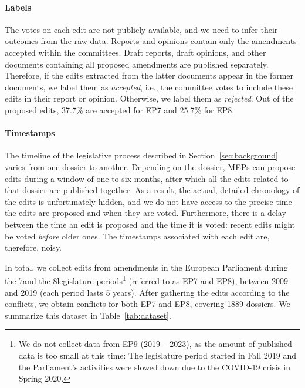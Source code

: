 \paragraph{Labels}
The votes on each edit are not publicly available, and we need to infer their outcomes from the raw data.
Reports and opinions contain only the amendments accepted within the committees.
Draft reports, draft opinions, and other documents containing all proposed amendments are published separately.
Therefore, if the edits extracted from the latter documents  appear in the former documents, we label them as \emph{accepted}, i.e., the committee votes to include these edits in their report or opinion.
Otherwise, we label them as \emph{rejected}.
Out of the proposed edits, 37.7\% are accepted for EP7 and 25.7\% for EP8.

\paragraph{Timestamps}
The timeline of the legislative process described in Section~\ref{sec:background} varies from one dossier to another.
Depending on the dossier, MEPs can propose edits during a window of one to six months, after which all the edits related to that dossier are published together.
As a result, the actual, detailed chronology of the edits is unfortunately hidden, and we do not have access to the precise time the edits are proposed and when they are voted.
Furthermore, there is a delay between the time an edit is proposed and the time it is voted: recent edits might be voted \emph{before} older ones.
The timestamps associated with each edit are, therefore, noisy.



In total, we collect  edits from  amendments in the European Parliament during the 7\th and the 8\th legislature periods\footnote{We do not collect data from EP9 (2019 -- 2023), as the amount of published data is too small at this time: The legislature period started in Fall 2019 and the Parliament's activities were slowed down due to the COVID-19 crisis in Spring 2020.} (referred to as EP7 and EP8), between 2009 and 2019 (each period lasts 5 years).
After gathering the edits according to the conflicts, we obtain  conflicts for both EP7 and EP8, covering 1889 dossiers.
We summarize this dataset in Table~\ref{tab:dataset}.

